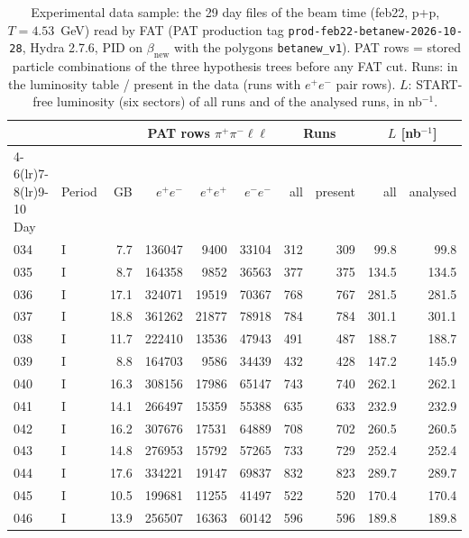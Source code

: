\begin{table}[H]
\centering\footnotesize
\setlength{\tabcolsep}{3.5pt}
\caption{Experimental data sample: the 29 day files of the beam time (feb22, p+p, $T=4.53$~GeV) read by FAT (PAT production tag \texttt{prod-feb22-betanew-2026-10-28}, Hydra 2.7.6, PID on $\beta_\mathrm{new}$ with the polygons \texttt{betanew\_v1}). PAT rows = stored particle combinations of the three hypothesis trees before any FAT cut. Runs: in the luminosity table / present in the data (runs with $e^+e^-$ pair rows). $L$: START-free luminosity (six sectors) of all runs and of the analysed runs, in nb$^{-1}$.}
\label{tab:smp_samples}
\begin{tabular}{llr rrr rr rr}
\toprule
 & & & \multicolumn{3}{c}{PAT rows $\pi^+\pi^-\ell\ell$} & \multicolumn{2}{c}{Runs} & \multicolumn{2}{c}{$L$ [nb$^{-1}$]} \\
\cmidrule(lr){4-6}\cmidrule(lr){7-8}\cmidrule(lr){9-10}
Day & Period & GB & $e^+e^-$ & $e^+e^+$ & $e^-e^-$ & all & present & all & analysed \\
\midrule
034 & I & 7.7 & 136047 & 9400 & 33104 & 312 & 309 & 99.8 & 99.8 \\
035 & I & 8.7 & 164358 & 9852 & 36563 & 377 & 375 & 134.5 & 134.5 \\
036 & I & 17.1 & 324071 & 19519 & 70367 & 768 & 767 & 281.5 & 281.5 \\
037 & I & 18.8 & 361262 & 21877 & 78918 & 784 & 784 & 301.1 & 301.1 \\
038 & I & 11.7 & 222410 & 13536 & 47943 & 491 & 487 & 188.7 & 188.7 \\
039 & I & 8.8 & 164703 & 9586 & 34439 & 432 & 428 & 147.2 & 145.9 \\
040 & I & 16.3 & 308156 & 17986 & 65147 & 743 & 740 & 262.1 & 262.1 \\
041 & I & 14.1 & 266497 & 15359 & 55388 & 635 & 633 & 232.9 & 232.9 \\
042 & I & 16.2 & 307676 & 17531 & 64889 & 708 & 702 & 260.5 & 260.5 \\
043 & I & 14.8 & 276953 & 15792 & 57265 & 733 & 729 & 252.4 & 252.4 \\
044 & I & 17.6 & 334221 & 19147 & 69837 & 832 & 823 & 289.7 & 289.7 \\
045 & I & 10.5 & 199681 & 11255 & 41497 & 522 & 520 & 170.4 & 170.4 \\
046 & I & 13.9 & 256507 & 16363 & 60142 & 596 & 596 & 189.8 & 189.8 \\

\end{tabular}
\end{table}
